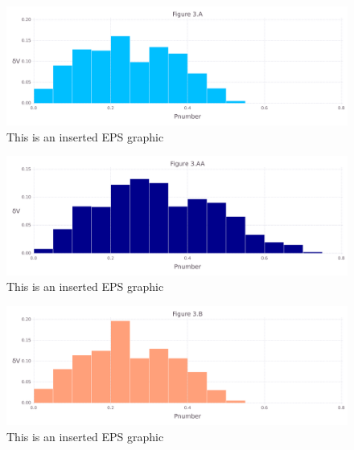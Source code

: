 \documentclass[10pt,letterpaper]{article}
\begin{document}
\begin{figure}[ht]
\begin{center}
\includegraphics[scale=0.5]{1xkk/3afigure_hi-precision.pdf}
\caption{This is an inserted EPS graphic}
\label{fig7}
\end{center}
\end{figure}

\begin{figure}[ht]
\begin{center}
\includegraphics[scale=0.5]{1xkk/3aafigure_hi-precision.pdf}
\caption{This is an inserted EPS graphic}
\label{fig8}
\end{center}
\end{figure}

\begin{figure}[ht]
\begin{center}
\includegraphics[scale=0.5]{1xkk/3bfigure_hi-precision.pdf}
\caption{This is an inserted EPS graphic}
\label{fig10}
\end{center}
\end{figure}
\end{document}
